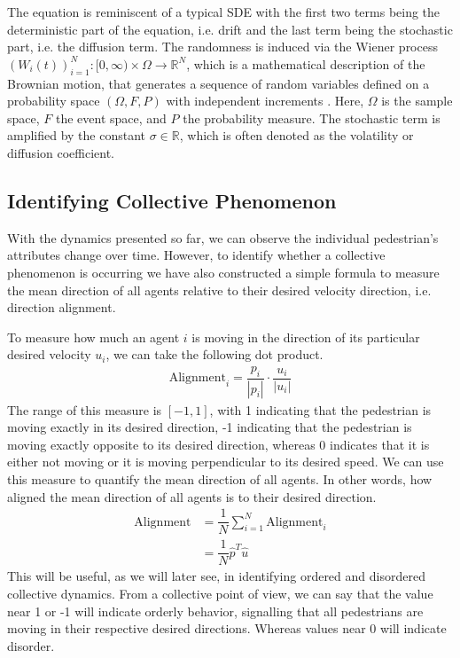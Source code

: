 The equation is reminiscent of a typical SDE with the first two terms being the deterministic part of the equation, i.e. drift and the last term being the stochastic part, i.e. the diffusion term. The randomness is induced via the Wiener process $(W_i(t))^N_{i=1}: [0,\infty) \times \Omega \rightarrow \mathbb{R}^N$, which is a mathematical description of the Brownian motion, that generates a sequence of random variables defined on a probability space $(\Omega, F, P)$ with independent increments \cite{oksendal2003stochastic}. Here, $\Omega$ is the sample space, $F$ the event space, and $P$ the probability measure. The stochastic term is amplified by the constant $\sigma \in \mathbb{R}$, which is often denoted as the volatility or diffusion coefficient.


\subsection{Identifying Collective Phenomenon}
With the dynamics presented so far, we can observe the individual pedestrian's attributes change over time. However, to identify whether a collective phenomenon is occurring we have also constructed a simple formula to measure the mean direction of all agents relative to their desired velocity direction, i.e. direction alignment.

To measure how much an agent $i$ is moving in the direction of its particular desired velocity $u_i$, we can take the following dot product.
\begin{gather}
    \text{Alignment}_i = \dfrac{p_i}{|p_i|} \cdot \dfrac{u_i}{|u_i|}
\end{gather}
The range of this measure is $[-1, 1]$, with 1 indicating that the pedestrian is moving exactly in its desired direction, -1 indicating that the pedestrian is moving exactly opposite to its desired direction, whereas 0 indicates that it is either not moving or it is moving perpendicular to its desired speed. We can use this measure to quantify the mean direction of all agents. In other words, how aligned the mean direction of all agents is to their desired direction.
\begin{align}
    \text{Alignment} &= \dfrac{1}{N}\sum_{i=1}^N \text{Alignment}_i \nonumber \\
    &= \dfrac{1}{N}\hat p^T \hat u
    \label{eq:alignment}
\end{align}
This will be useful, as we will later see, in identifying ordered and disordered collective dynamics. From a collective point of view, we can say that the value near 1 or -1 will indicate orderly behavior, signalling that all pedestrians are moving in their respective desired directions. Whereas values near 0 will indicate disorder.

